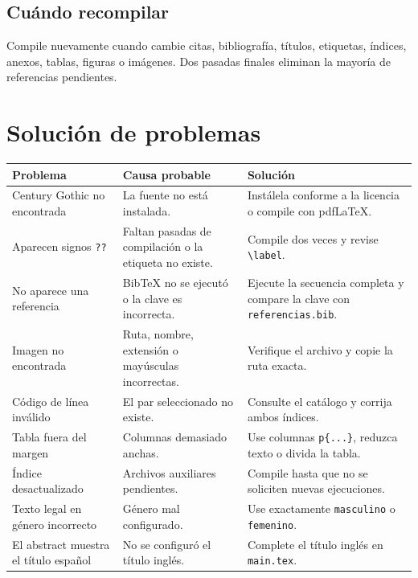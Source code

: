 \documentclass[12pt,a4paper,oneside]{report}
\begin{document}
\section{Cuándo recompilar}

Compile nuevamente cuando cambie citas, bibliografía, títulos, etiquetas, índices, anexos, tablas, figuras o imágenes. Dos pasadas finales eliminan la mayoría de referencias pendientes.

\chapter{Solución de problemas}

\begingroup
\small
\singlespacing
\begin{longtable}{|p{4.2cm}|p{4.2cm}|p{4.2cm}|}
  \hline
  \textbf{Problema} & \textbf{Causa probable} & \textbf{Solución} \\
  \hline
  Century Gothic no encontrada & La fuente no está instalada. & Instálela conforme a la licencia o compile con pdfLaTeX. \\
  \hline
  Aparecen signos \texttt{??} & Faltan pasadas de compilación o la etiqueta no existe. & Compile dos veces y revise \texttt{\textbackslash label}. \\
  \hline
  No aparece una referencia & BibTeX no se ejecutó o la clave es incorrecta. & Ejecute la secuencia completa y compare la clave con \texttt{referencias.bib}. \\
  \hline
  Imagen no encontrada & Ruta, nombre, extensión o mayúsculas incorrectas. & Verifique el archivo y copie la ruta exacta. \\
  \hline
  Código de línea inválido & El par seleccionado no existe. & Consulte el catálogo y corrija ambos índices. \\
  \hline
  Tabla fuera del margen & Columnas demasiado anchas. & Use columnas \texttt{p\{...\}}, reduzca texto o divida la tabla. \\
  \hline
  Índice desactualizado & Archivos auxiliares pendientes. & Compile hasta que no se soliciten nuevas ejecuciones. \\
  \hline
  Texto legal en género incorrecto & Género mal configurado. & Use exactamente \texttt{masculino} o \texttt{femenino}. \\
  \hline
  El abstract muestra el título español & No se configuró el título inglés. & Complete el título inglés en \texttt{main.tex}. \\
  \hline
\end{longtable}
\endgroup
\end{document}
